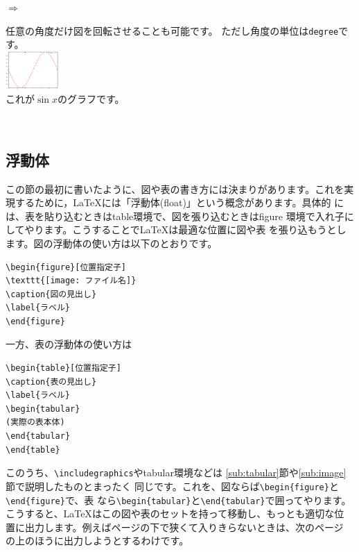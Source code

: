 $\Rightarrow$
\begin{minipage}{.45\textwidth}
\begin{shadebox}
任意の角度だけ図を回転させることも可能です。
ただし角度の単位は\verb+degree+です。\\
\includegraphics[width=20mm,angle=90.0]
{sin.eps}\\
これが$\sin x$のグラフです。
\end{shadebox}
\end{minipage}
\vspace*{1mm}\\

\subsection{浮動体}
この節の最初に書いたように、図や表の書き方には決まりがあります。これを実
現するために，{\LaTeX}には「浮動体(float)」という概念があります。具体的
には、表を貼り込むときはtable環境で、図を張り込むときはfigure
環境で入れ子にしてやります。こうすることで{\LaTeX}は最適な位置に図や表
を張り込もうとします。図の浮動体の使い方は以下のとおりです。
\begin{screen}
\begin{verbatim}
\begin{figure}[位置指定子]
\texttt{[image: ファイル名]}
\caption{図の見出し}
\label{ラベル}
\end{figure}
\end{verbatim}
\end{screen}
一方、表の浮動体の使い方は
\begin{screen}
\begin{verbatim}
\begin{table}[位置指定子]
\caption{表の見出し}
\label{ラベル}
\begin{tabular}
(実際の表本体)
\end{tabular}
\end{table}
\end{verbatim}
\end{screen}
このうち、\verb+\includegraphics+やtabular環境などは
\ref{sub:tabular}節や\ref{sub:image}節で説明したものとまったく
同じです。これを、図ならば\verb+\begin{figure}+と\verb+\end{figure}+で、表
なら\verb+\begin{tabular}+と\verb+\end{tabular}+で囲ってやります。
こうすると、{\LaTeX}はこの図や表のセットを持って移動し、もっとも適切な位
置に出力します。例えばページの下で狭くて入りきらないときは、次のページ
の上のほうに出力しようとするわけです。

